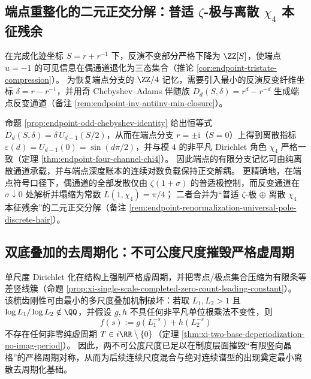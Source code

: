 \subsection{端点重整化的二元正交分解：普适 \texorpdfstring{$\zeta$}{zeta}-极与离散 \texorpdfstring{$\chi_4$}{chi4} 本征残余}\label{subsec:cdim-endpoint-renorm-zeta-chi4}
在完成化迹坐标 \(S=r+r^{-1}\) 下，反演不变部分严格下降为 \(\ZZ[S]\)，使端点 \(u=-1\) 的可见信息在偶通道退化为三态集合（推论 \ref{cor:endpoint-tristate-compression}）。
为恢复端点分支的 \(\ZZ/4\) 记忆，需要引入最小的反演反变纤维坐标 \(\delta=r-r^{-1}\)，并用奇 Chebyshev--Adams 伴随族 \(D_d(S,\delta)=r^{d}-r^{-d}\) 生成端点反变通道（备注 \ref{rem:endpoint-inv-antiinv-min-closure}）。

命题 \ref{prop:endpoint-odd-chebyshev-identity} 给出恒等式 \(D_d(S,\delta)=\delta\,U_{d-1}(S/2)\)，从而在端点分支 \(r=\pm \mathrm{i}\)（\(S=0\)）上得到离散指标 \(\varepsilon(d)=U_{d-1}(0)=\sin(d\pi/2)\)，并与模 \(4\) 的非平凡 Dirichlet 角色 \(\chi_4\) 严格一致（定理 \ref{thm:endpoint-four-channel-chi4}）。
因此端点的有限分支记忆可由纯离散通道承载，并与端点深度账本的连续对数负载保持正交解耦。
更精确地，在端点符号口径下，偶通道的全部发散仅由 \(\zeta(1+\sigma)\) 的普适极控制，而反变通道在 \(\sigma\downarrow 0\) 处解析并塌缩为常数 \(L(1,\chi_4)=\pi/4\)；
二者合并为“普适 \(\zeta\)-极 \(\oplus\) 离散 \(\chi_4\) 本征残余”的二元正交分解（备注 \ref{rem:endpoint-renormalization-universal-pole-discrete-hair}）。

\subsection{双底叠加的去周期化：不可公度尺度摧毁严格虚周期}\label{subsec:cdim-two-base-deperiodization}
单尺度 Dirichlet 化在结构上强制严格虚周期，并把零点/极点集合压缩为有限条等差竖线簇（命题 \ref{prop:xi-single-scale-completed-zero-count-leading-constant}）。
该梳齿刚性可由最小的多尺度叠加机制破坏：若取 \(L_1,L_2>1\) 且 \(\log L_1/\log L_2\notin\QQ\)，并假设 \(g,h\) 不具任何非平凡单位根乘法不变性，则
\[
f(s):=g(L_1^{-s})+h(L_2^{-s})
\]
不存在任何非零纯虚周期 \(T\in i\RR\setminus\{0\}\)（定理 \ref{thm:xi-two-base-deperiodization-no-imag-period}）。
因此，两不可公度尺度已足以在制度层面摧毁“有限竖向晶格”的严格周期对称，从而为后续连续尺度混合与绝对连续谱型的出现奠定最小离散去周期化基础。


